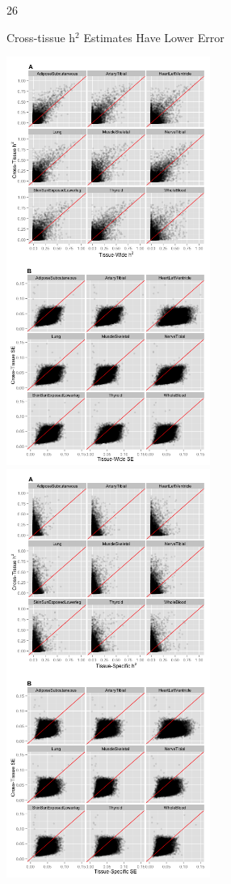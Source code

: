\documentclass[final]{beamer}
\newcommand{\ColWidth}{26}
\begin{document}
\begin{frame}{}
\begin{textblock}{\ColWidth}
\begin{block}{Cross-tissue h$^2$ Estimates Have Lower Error}
	\begin{center}
		\includegraphics[width=0.5\textwidth]{plots/Fig5.png}
		\includegraphics[width=0.5\textwidth]{plots/FigS2.png}
		


\end{center}
\end{block}
\end{textblock}
\end{frame}
\end{document}
